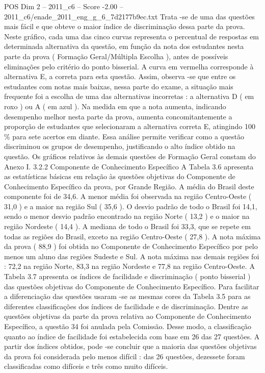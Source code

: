 \begin{textsample}{POS Dim 2 – 2011\_c6 – Score -2.00 – 2011\_c6/enade\_2011\_eng\_g\_6\_7d2177b9ec.txt}
Trata -se de uma das questões mais fácil e que obteve o maior índice de discriminação dessa parte da prova.
Neste gráfico, cada uma das cinco curvas representa o percentual de respostas em determinada alternativa da questão, em função da nota dos estudantes nesta parte da prova ( Formação Geral/Múltipla Escolha ), antes de possíveis eliminações pelo critério do ponto bisserial.
A curva em vermelha corresponde à alternativa E, a correta para esta questão.
Assim, observa -se que entre os estudantes com notas mais baixas, nessa parte do exame, a situação mais frequente foi a escolha de uma das alternativas incorretas : a alternativa D ( em roxo ) ou A ( em azul ).
Na medida em que a nota aumenta, indicando desempenho melhor nesta parte da prova, aumenta concomitantemente a proporção de estudantes que selecionaram a alternativa correta E, atingindo 100 \% para sete acertos em diante.
Essa análise permite verificar como a questão discriminou os grupos de desempenho, justificando o alto índice obtido na questão.
Os gráficos relativos às demais questões de Formação Geral constam do Anexo I. 3.2.2 Componente de Conhecimento Específico A Tabela 3.6 apresenta as estatísticas básicas em relação às questões objetivas do Componente de Conhecimento Específico da prova, por Grande Região.
A média do Brasil deste componente foi de 34,6.
A menor média foi observada na região Centro-Oeste ( 31,0 ) e a maior na região Sul ( 35,6 ).
O desvio padrão de todo o Brasil foi 14,1, sendo o menor desvio padrão encontrado na região Norte ( 13,2 ) e o maior na região Nordeste ( 14,4 ).
A mediana de todo o Brasil foi 33,3, que se repete em todas as regiões do Brasil, exceto na região Centro-Oeste ( 27,8 ).
A nota máxima da prova ( 88,9 ) foi obtida no Componente de Conhecimento Específico por pelo menos um aluno das regiões Sudeste e Sul.
A nota máxima nas demais regiões foi : 72,2 na região Norte, 83,3 na região Nordeste e 77,8 na região Centro-Oeste.
A Tabela 3.7 apresenta os índices de facilidade e discriminação ( ponto bisserial ) das questões objetivas do Componente de Conhecimento Específico.
Para facilitar a diferenciação das questões usaram -se as mesmas cores da Tabela 3.5 para as diferentes classificações dos índices de facilidade e de discriminação.
Dentre as questões objetivas da parte da prova relativa ao Componente de Conhecimento Específico, a questão 34 foi anulada pela Comissão.
Desse modo, a classificação quanto ao índice de facilidade foi estabelecida com base em 26 das 27 questões.
A partir dos índices obtidos, pode -se concluir que a maioria das questões objetivas da prova foi considerada pelo menos difícil : das 26 questões, dezessete foram classificadas como difíceis e três como muito difíceis.

\end{textsample}
